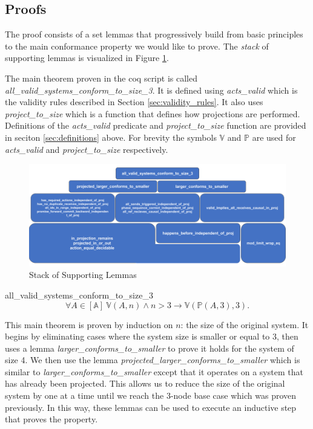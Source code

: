 \documentclass[runningheads]{llncs}
\newcommand{\action}{\mathds{A}}
\newcommand{\listaction}{[\action]}
\newcommand{\actsvalid}[2]{\mathds{V}(#1, #2)}
\newcommand{\projectsize}[2]{\mathds{P}(#1, #2)}
\begin{document}
\subsection{Proofs}

The proof consists of a set lemmas that progressively build from basic principles to the main conformance property we would like to prove. The \emph{stack} of supporting lemmas is visualized in Figure \ref{fig:coqLemmaStack}.


The main theorem proven in the coq script is called \emph{all\_valid\_systems\_conform\_to\_size\_3}. It is defined using \emph{acts\_valid} which is the validity rules described in Section \ref{sec:validity_rules}. It also uses \emph{project\_to\_size} which is a function that defines how projections are performed. Definitions of the \emph{acts\_valid} predicate and \emph{project\_to\_size} function are provided in seciton \ref{sec:definitions} above.
For brevity the symbols $\mathds{V}$ and $\mathds{P}$ are used for \emph{acts\_valid} and \emph{project\_to\_size} respectively.

\begin{figure}[h]
    \centering
    \includegraphics[scale=0.35]{CoqLemmaStack.png}
    \caption{Stack of Supporting Lemmas}
    \label{fig:coqLemmaStack}
\end{figure}


\begin{theorem}{all\_valid\_systems\_conform\_to\_size\_3}
$$\forall A \in \listaction\ \actsvalid{A}{n} \wedge n > 3 \longrightarrow \actsvalid{\projectsize{A}{3}}{3}.$$
\end{theorem}
This main theorem is proven by induction on $n$: the size of the original system. It begins by eliminating cases where the system size is smaller or equal to 3, then uses a lemma \emph{larger\_conforms\_to\_smaller} to prove it holds for the system of size 4. We then use the lemma \emph{projected\_larger\_conforms\_to\_smaller} which is similar to \emph{larger\_conforms\_to\_smaller} except that it operates on a system that has already been projected. This allows us to reduce the size of the original system by one at a time until we reach the 3-node base case which was proven previously.  In this way, these lemmas can be used to execute an inductive step that proves the property. 
\end{document}
